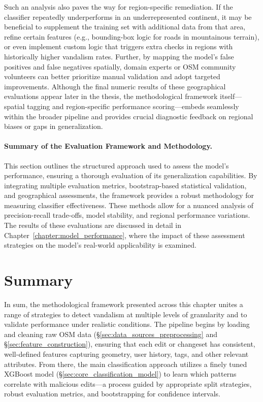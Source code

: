 \documentclass[
    13pt, %
    a4paper, %
    listof=totoc, %
    bibliography=totoc, %
    index=totoc, %
    headsepline
]{scrreprt}
\begin{document}
Such an analysis also paves the way for region-specific remediation. If the classifier repeatedly underperforms in an underrepresented continent, it may be beneficial to supplement the training set with additional data from that area, refine certain features (e.g., bounding-box logic for roads in mountainous terrain), or even implement custom logic that triggers extra checks in regions with historically higher vandalism rates. Further, by mapping the model’s false positives and false negatives spatially, domain experts or OSM community volunteers can better prioritize manual validation and adopt targeted improvements. Although the final numeric results of these geographical evaluations appear later in the thesis, the methodological framework itself—spatial tagging and region-specific performance scoring—embeds seamlessly within the broader pipeline and provides crucial diagnostic feedback on regional biases or gaps in generalization.

\paragraph{Summary of the Evaluation Framework and Methodology.}
This section outlines the structured approach used to assess the model’s performance, ensuring a thorough evaluation of its generalization capabilities. By integrating multiple evaluation metrics, bootstrap-based statistical validation, and geographical assessments, the framework provides a robust methodology for measuring classifier effectiveness. These methods allow for a nuanced analysis of precision-recall trade-offs, model stability, and regional performance variations. The results of these evaluations are discussed in detail in Chapter~\ref{chapter:model_performance}, where the impact of these assessment strategies on the model's real-world applicability is examined.

\section{Summary}
\label{sec:method_summary_integration}

In sum, the methodological framework presented across this chapter unites a range of strategies to detect vandalism at multiple levels of granularity and to validate performance under realistic conditions. The pipeline begins by loading and cleaning raw OSM data (\S\ref{sec:data_sources_preprocessing} and \S\ref{sec:feature_construction}), ensuring that each edit or changeset has consistent, well-defined features capturing geometry, user history, tags, and other relevant attributes. From there, the main classification approach utilizes a finely tuned XGBoost model (\S\ref{sec:core_classification_model}) to learn which patterns correlate with malicious edits—a process guided by appropriate split strategies, robust evaluation metrics, and bootstrapping for confidence intervals.
\end{document}
